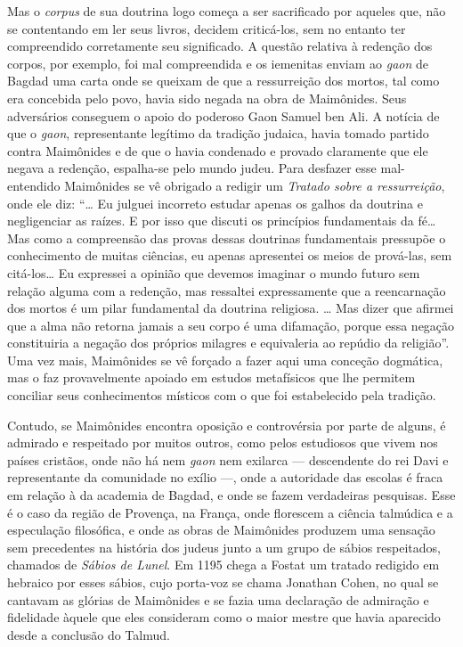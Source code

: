 Mas o \emph{corpus} de sua doutrina logo começa a ser sacrificado por
aqueles que, não se contentando em ler seus livros, decidem criticá-los,
sem no entanto ter compreendido corretamente seu significado. A questão
relativa à redenção dos corpos, por exemplo, foi mal compreendida e os
iemenitas enviam ao \emph{gaon} de Bagdad uma carta onde se queixam de que a
ressurreição dos mortos, tal como era concebida pelo povo, havia sido
negada na obra de Maimônides. Seus adversários conseguem o apoio do poderoso 
Gaon Samuel ben Ali. A notícia de que o \emph{gaon}, representante legítimo da tradição
judaica, havia tomado partido contra Maimônides e de que o havia
condenado e provado claramente que ele negava a redenção, espalha-se
pelo mundo judeu. Para desfazer esse mal-entendido Maimônides se vê
obrigado a redigir um \emph{Tratado sobre a ressurreição}, onde ele diz:
``\ldots{} Eu julguei incorreto estudar apenas os galhos da doutrina e
negligenciar as raízes. E por isso que discuti os princípios
fundamentais da fé\ldots{} Mas como a compreensão das provas dessas
doutrinas fundamentais pressupõe o conhecimento de muitas ciências, eu
apenas apresentei os meios de prová-las, sem citá-los\ldots{} Eu expressei a
opinião que devemos imaginar o mundo futuro sem relação alguma com a
redenção, mas ressaltei expressamente que a reencarnação dos mortos é
um pilar fundamental da doutrina religiosa. \ldots{} Mas dizer que afirmei
que a alma não retorna jamais a seu corpo é uma difamação, porque essa
negação constituiria a negação dos próprios milagres e equivaleria ao
repúdio da religião''. Uma vez mais, Maimônides se vê forçado a fazer
aqui uma conceção dogmática, mas o faz provavelmente apoiado em estudos
metafísicos que lhe permitem conciliar seus conhecimentos místicos com
o que foi estabelecido pela tradição.

Contudo, se Maimônides encontra oposição e controvérsia por parte de
alguns, é admirado e respeitado por muitos outros, como pelos
estudiosos que vivem nos países cristãos, onde não há nem \emph{gaon} nem
exilarca --- descendente do rei Davi e representante da comunidade no exílio ---, 
onde a autoridade das
escolas é fraca em relação à da academia de Bagdad, e onde se fazem
verdadeiras pesquisas. Esse é o caso da região de Provença, na França,
onde florescem a ciência talmúdica e a especulação filosófica, e onde as
obras de Maimônides produzem uma sensação sem precedentes na história
dos judeus junto a um grupo de sábios respeitados, chamados de \emph{Sábios
de Lunel}. Em 1195 chega a Fostat um tratado redigido em hebraico por
esses sábios, cujo porta-voz se chama Jonathan Cohen, no qual se
cantavam as glórias de Maimônides e se fazia uma declaração de admiração
e fidelidade àquele que eles consideram como o maior mestre que havia
aparecido desde a conclusão do Talmud.

